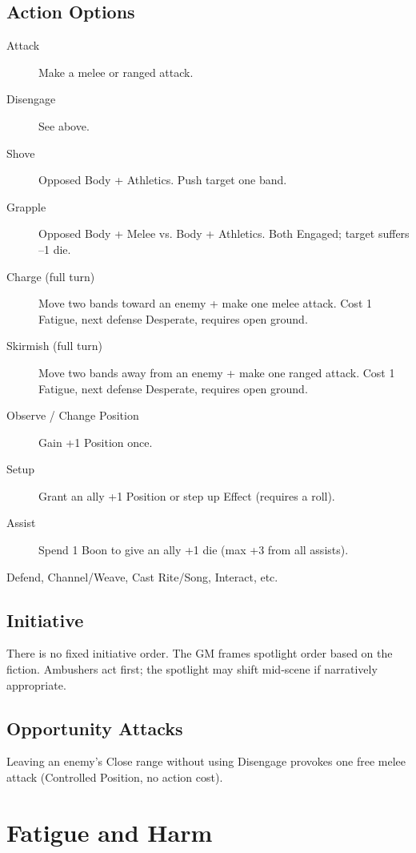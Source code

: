 \subsection{Action Options}
\begin{description}
    \item[Attack] Make a melee or ranged attack.
    \item[Disengage] See above.
    \item[Shove] Opposed Body + Athletics. Push target one band.
    \item[Grapple] Opposed Body + Melee vs. Body + Athletics. Both Engaged;
        target suffers --1 die.
    \item[Charge (full turn)] Move two bands toward an enemy + make one melee
        attack. Cost 1 Fatigue, next defense Desperate, requires open ground.
    \item[Skirmish (full turn)] Move two bands away from an enemy + make one
        ranged attack. Cost 1 Fatigue, next defense Desperate, requires open
        ground.
    \item[Observe / Change Position] Gain +1 Position once.
    \item[Setup] Grant an ally +1 Position or step up Effect (requires a roll).
    \item[Assist] Spend 1 Boon to give an ally +1 die (max +3 from all assists).
    \item[Defend, Channel/Weave, Cast Rite/Song, Interact, etc.]
\end{description}

\subsection{Initiative}
There is no fixed initiative order. The GM frames spotlight order based on the
fiction. Ambushers act first; the spotlight may shift mid‑scene if narratively
appropriate.

\subsection{Opportunity Attacks}
Leaving an enemy's Close range without using Disengage provokes one free melee
attack (Controlled Position, no action cost).

\section{Fatigue and Harm}\label{sec:fatigue_harm}

